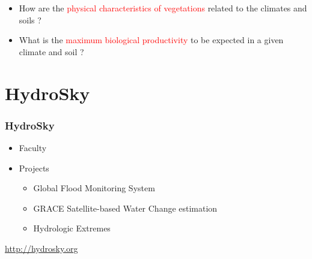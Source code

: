 \documentclass{beamer}
\begin{document}
\begin{CJK}{UTF8}{gkai}
{{\begin{table}
{\begin{tabular}{ccc}
\end{tabular}
}
\end{table}
\begin{itemize}
\item How are the  \textcolor{red}{physical characteristics of vegetations} related to the climates and soils ? \\
\item What is the  \textcolor{red}{maximum biological productivity} to be expected in a given climate and soil ?\\
\end{itemize}
  }
  
  
  
  \section{HydroSky}
  \frame
  {
  \frametitle{HydroSky}
  \begin{itemize}
  \item Faculty
  \item Projects
    \begin{itemize}
    \item  Global Flood Monitoring System
    \item  GRACE Satellite-based  Water  Change estimation
    \item  Hydrologic Extremes
    \end{itemize}
  \end{itemize}
\url{http://hydrosky.org}
  }
  
}
\end{CJK}
\end{document}
